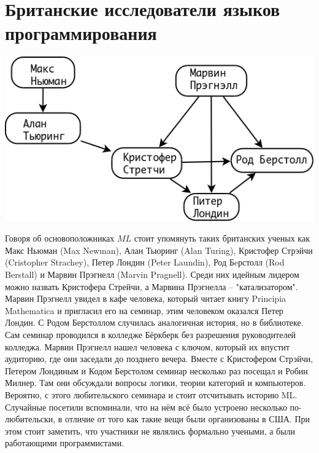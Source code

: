 \documentclass[14pt]{matmex-diploma-custom}
\begin{document}
\section{Британские исследователи языков программирования}
\includegraphics[angle=0,scale=0.4]{british.png}

Говоря об основоположниках $M\!L$ стоит упомянуть таких британских ученых как Макс Ньюман (Max Newman), Алан Тьюринг (Alan Turing), Кристофер Стрэйчи (Cristopher Strachey), Петер Лондин (Peter Laundin), Род Бeрстолл (Rod Berstall) и Марвин Прэгнелл (Marvin Pragnell). Среди них идейным лидером можно назвать Кристофера Стрейчи, а Марвина Прэгнелла -- "катализатором". Марвин Прэгнелл увидел в кафе человека, который читает книгу Principia Mathematica \cite{russel1} и пригласил его на семинар, этим человеком оказался Петер Лондин. С Родом Берстоллом случилась аналогичная история, но в библиотеке. Сам семинар проводился в колледже Бёркберк без разрешения руководителей колледжа. Марвин Прэгнелл нашел человека с ключом, который их впустит аудиторию, где они заседали до позднего вечера. Вместе с Кристофером Стрэйчи, Петером Лондиным и Кодом Берстолом семинар несколько раз посещал и Робин Милнер. Там они обсуждали вопросы логики, теории категорий и компьютеров. Вероятно, с этого любительского семинара и стоит отсчитывать историю ML. Случайные посетили вспоминали, что на нём всё было устроено несколько по-любительски, в отличие от того как такие вещи были организованы в США. При этом стоит заметить, что участники не являлись формально учеными, а были работающими программистами.
\end{document}

